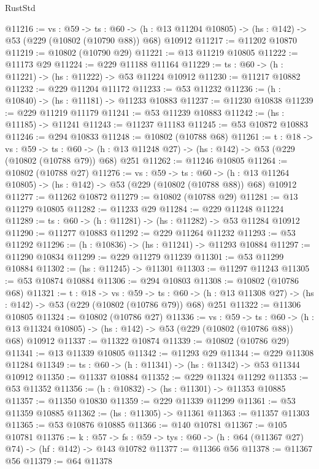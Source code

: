 \begin{lexlean}{RustStd}
\begin{coremodule}
@11216 := {vs : @59} ->
  {ts : @60} ->
  (h : @13 @11204 @10805) -> (hs : @142) -> @53 (@229 (@10802 (@10790 @88)) @68) @10912
@11217 := @11202 @10870
@11219 := @10802 (@10790 @29)
@11221 := @13 @11219 @10805
@11222 := @11173 @29
@11224 := @229 @11188 @11164
@11229 := {ts : @60} -> (h : @11221) -> (hs : @11222) -> @53 @11224 @10912
@11230 := @11217 @10882
@11232 := @229 @11204 @11172
@11233 := @53 @11232
@11236 := (h : @10840) -> (hs : @11181) -> @11233 @10883
@11237 := @11230 @10838
@11239 := @229 @11219 @11179
@11241 := @53 @11239 @10883
@11242 := (hs : @11185) -> @11241
@11243 := @11237 @11183
@11245 := @53 @10872 @10883
@11246 := @294 @10833
@11248 := @10802 (@10788 @68)
@11261 := {t : @18} ->
  {vs : @59} ->
  {ts : @60} -> (h : @13 @11248 @27) -> (hs : @142) -> @53 (@229 (@10802 (@10788 @79)) @68) @251
@11262 := @11246 @10805
@11264 := @10802 (@10788 @27)
@11276 := {vs : @59} ->
  {ts : @60} ->
  (h : @13 @11264 @10805) -> (hs : @142) -> @53 (@229 (@10802 (@10788 @88)) @68) @10912
@11277 := @11262 @10872
@11279 := @10802 (@10788 @29)
@11281 := @13 @11279 @10805
@11282 := @11233 @29
@11284 := @229 @11248 @11224
@11289 := {ts : @60} -> (h : @11281) -> (hs : @11282) -> @53 @11284 @10912
@11290 := @11277 @10883
@11292 := @229 @11264 @11232
@11293 := @53 @11292
@11296 := (h : @10836) -> (hs : @11241) -> @11293 @10884
@11297 := @11290 @10834
@11299 := @229 @11279 @11239
@11301 := @53 @11299 @10884
@11302 := (hs : @11245) -> @11301
@11303 := @11297 @11243
@11305 := @53 @10874 @10884
@11306 := @294 @10803
@11308 := @10802 (@10786 @68)
@11321 := {t : @18} ->
  {vs : @59} ->
  {ts : @60} -> (h : @13 @11308 @27) -> (hs : @142) -> @53 (@229 (@10802 (@10786 @79)) @68) @251
@11322 := @11306 @10805
@11324 := @10802 (@10786 @27)
@11336 := {vs : @59} ->
  {ts : @60} ->
  (h : @13 @11324 @10805) -> (hs : @142) -> @53 (@229 (@10802 (@10786 @88)) @68) @10912
@11337 := @11322 @10874
@11339 := @10802 (@10786 @29)
@11341 := @13 @11339 @10805
@11342 := @11293 @29
@11344 := @229 @11308 @11284
@11349 := {ts : @60} -> (h : @11341) -> (hs : @11342) -> @53 @11344 @10912
@11350 := @11337 @10884
@11352 := @229 @11324 @11292
@11353 := @53 @11352
@11356 := (h : @10832) -> (hs : @11301) -> @11353 @10885
@11357 := @11350 @10830
@11359 := @229 @11339 @11299
@11361 := @53 @11359 @10885
@11362 := (hs : @11305) -> @11361
@11363 := @11357 @11303
@11365 := @53 @10876 @10885
@11366 := @140 @10781
@11367 := @105 @10781
@11376 := {k : @57} ->
  {fs : @59} -> {tys : @60} -> (h : @64 (@11367 @27) @74) -> (hf : @142) -> @143 @10782
@11377 := @11366 @56
@11378 := @11367 @56
@11379 := @64 @11378

\end{coremodule}
\end{lexlean}
